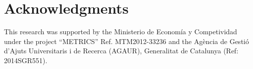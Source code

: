\documentclass[10pt, a4paper]{article}
\begin{document}
\section*{Acknowledgments}
This research was supported by the Ministerio de Econom\'ia y Competividad under the project
``METRICS'' Ref. MTM2012-33236 and the Agència de Gestió d'Ajuts Universitaris i de Recerca (AGAUR), Generalitat de Catalunya (Ref: 2014SGR551).



{}


% 
% 
% 
% 
% 
% 
% 
\end{document}
